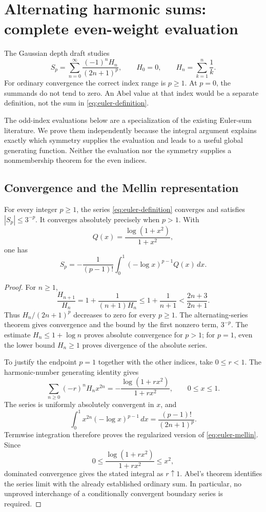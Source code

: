 \section{Alternating harmonic sums: complete even-weight evaluation}
\label{sec:euler}

The Gaussian depth draft studies
\begin{equation}
S_p=\sum_{n=0}^{\infty}\frac{(-1)^nH_n}{(2n+1)^p},
\qquad H_0=0,\qquad H_n=\sum_{k=1}^{n}\frac1k.
\label{eq:euler-definition}
\end{equation}
For ordinary convergence the correct index range is \(p\ge1\).
At \(p=0\), the summands do not tend to zero. An Abel value at that
index would be a separate definition, not the sum in
\eqref{eq:euler-definition}.

The odd-index evaluations below are a specialization of the existing
Euler-sum literature. We prove them independently because the integral
argument explains exactly which symmetry supplies the evaluation and
leads to a useful global generating function. Neither the evaluation
nor the symmetry supplies a nonmembership theorem for the even indices.

\subsection{Convergence and the Mellin representation}

\begin{lemma}\label{lem:euler-mellin}
For every integer \(p\ge1\), the series \eqref{eq:euler-definition}
converges and satisfies \(|S_p|\le3^{-p}\). It converges absolutely
precisely when \(p>1\). With
\[
Q(x)=\frac{\log(1+x^2)}{1+x^2},
\]
one has
\begin{equation}
S_p=-\frac1{(p-1)!}\int_0^1(-\log x)^{p-1}Q(x)\,dx.
\label{eq:euler-mellin}
\end{equation}
\end{lemma}

\begin{proof}
For \(n\ge1\),
\[
\frac{H_{n+1}}{H_n}
=1+\frac1{(n+1)H_n}
\le1+\frac1{n+1}
<\frac{2n+3}{2n+1}.
\]
Thus \(H_n/(2n+1)^p\) decreases to zero for every \(p\ge1\).
The alternating-series theorem gives convergence and the bound by
the first nonzero term, \(3^{-p}\). The estimate
\(H_n\le1+\log n\) proves absolute convergence for \(p>1\);
for \(p=1\), even the lower bound \(H_n\ge1\) proves divergence
of the absolute series.

To justify the endpoint \(p=1\) together with the other indices, take
\(0\le r<1\). The harmonic-number generating identity gives
\[
\sum_{n\ge0}(-r)^nH_nx^{2n}
=-\frac{\log(1+rx^2)}{1+rx^2},\qquad 0\le x\le1.
\]
The series is uniformly absolutely convergent in \(x\), and
\[
\int_0^1x^{2n}(-\log x)^{p-1}\,dx
=\frac{(p-1)!}{(2n+1)^p}.
\]
Termwise integration therefore proves the regularized version of
\eqref{eq:euler-mellin}. Since
\[
0\le \frac{\log(1+rx^2)}{1+rx^2}\le x^2,
\]
dominated convergence gives the stated integral as \(r\uparrow1\).
Abel's theorem identifies the series limit with the already established
ordinary sum. In particular, no unproved interchange of a conditionally
convergent boundary series is required.
\end{proof}

